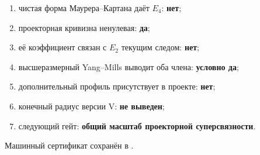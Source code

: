 \begin{protocol}
\begin{enumerate}
 \item чистая форма Маурера--Картана даёт $E_4$: \textbf{нет};
 \item проекторная кривизна ненулевая: \textbf{да};
 \item её коэффициент связан с $E_2$ текущим следом: \textbf{нет};
 \item высшеразмерный Yang--Mills выводит оба члена: \textbf{условно да};
 \item дополнительный профиль присутствует в проекте: \textbf{нет};
 \item конечный радиус версии V: \textbf{не выведен};
 \item следующий гейт: \textbf{общий масштаб проекторной суперсвязности}.
\end{enumerate}
\end{protocol}

Машинный сертификат сохранён в
.
